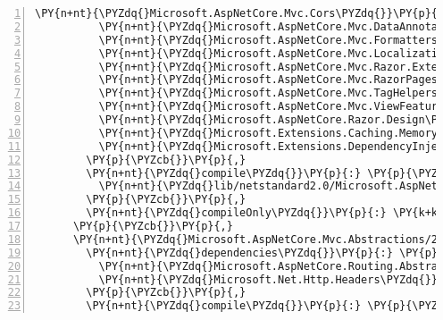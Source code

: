 \begin{Verbatim}[commandchars=\\\{\},numbers=left,firstnumber=1,stepnumber=1,numberblanklines=0]
          \PY{n+nt}{\PYZdq{}Microsoft.AspNetCore.Mvc.Cors\PYZdq{}}\PY{p}{:} \PY{l+s+s2}{\PYZdq{}2.1.0\PYZhy{}rc1\PYZhy{}final\PYZdq{}}\PY{p}{,}
          \PY{n+nt}{\PYZdq{}Microsoft.AspNetCore.Mvc.DataAnnotations\PYZdq{}}\PY{p}{:} \PY{l+s+s2}{\PYZdq{}2.1.0\PYZhy{}rc1\PYZhy{}final\PYZdq{}}\PY{p}{,}
          \PY{n+nt}{\PYZdq{}Microsoft.AspNetCore.Mvc.Formatters.Json\PYZdq{}}\PY{p}{:} \PY{l+s+s2}{\PYZdq{}2.1.0\PYZhy{}rc1\PYZhy{}final\PYZdq{}}\PY{p}{,}
          \PY{n+nt}{\PYZdq{}Microsoft.AspNetCore.Mvc.Localization\PYZdq{}}\PY{p}{:} \PY{l+s+s2}{\PYZdq{}2.1.0\PYZhy{}rc1\PYZhy{}final\PYZdq{}}\PY{p}{,}
          \PY{n+nt}{\PYZdq{}Microsoft.AspNetCore.Mvc.Razor.Extensions\PYZdq{}}\PY{p}{:} \PY{l+s+s2}{\PYZdq{}2.1.0\PYZhy{}rc1\PYZhy{}final\PYZdq{}}\PY{p}{,}
          \PY{n+nt}{\PYZdq{}Microsoft.AspNetCore.Mvc.RazorPages\PYZdq{}}\PY{p}{:} \PY{l+s+s2}{\PYZdq{}2.1.0\PYZhy{}rc1\PYZhy{}final\PYZdq{}}\PY{p}{,}
          \PY{n+nt}{\PYZdq{}Microsoft.AspNetCore.Mvc.TagHelpers\PYZdq{}}\PY{p}{:} \PY{l+s+s2}{\PYZdq{}2.1.0\PYZhy{}rc1\PYZhy{}final\PYZdq{}}\PY{p}{,}
          \PY{n+nt}{\PYZdq{}Microsoft.AspNetCore.Mvc.ViewFeatures\PYZdq{}}\PY{p}{:} \PY{l+s+s2}{\PYZdq{}2.1.0\PYZhy{}rc1\PYZhy{}final\PYZdq{}}\PY{p}{,}
          \PY{n+nt}{\PYZdq{}Microsoft.AspNetCore.Razor.Design\PYZdq{}}\PY{p}{:} \PY{l+s+s2}{\PYZdq{}2.1.0\PYZhy{}rc1\PYZhy{}final\PYZdq{}}\PY{p}{,}
          \PY{n+nt}{\PYZdq{}Microsoft.Extensions.Caching.Memory\PYZdq{}}\PY{p}{:} \PY{l+s+s2}{\PYZdq{}2.1.0\PYZhy{}rc1\PYZhy{}final\PYZdq{}}\PY{p}{,}
          \PY{n+nt}{\PYZdq{}Microsoft.Extensions.DependencyInjection\PYZdq{}}\PY{p}{:} \PY{l+s+s2}{\PYZdq{}2.1.0\PYZhy{}rc1\PYZhy{}final\PYZdq{}}
        \PY{p}{\PYZcb{}}\PY{p}{,}
        \PY{n+nt}{\PYZdq{}compile\PYZdq{}}\PY{p}{:} \PY{p}{\PYZob{}}
          \PY{n+nt}{\PYZdq{}lib/netstandard2.0/Microsoft.AspNetCore.Mvc.dll\PYZdq{}}\PY{p}{:} \PY{p}{\PYZob{}}\PY{p}{\PYZcb{}}
        \PY{p}{\PYZcb{}}\PY{p}{,}
        \PY{n+nt}{\PYZdq{}compileOnly\PYZdq{}}\PY{p}{:} \PY{k+kc}{true}
      \PY{p}{\PYZcb{}}\PY{p}{,}
      \PY{n+nt}{\PYZdq{}Microsoft.AspNetCore.Mvc.Abstractions/2.1.0\PYZhy{}rc1\PYZhy{}final\PYZdq{}}\PY{p}{:} \PY{p}{\PYZob{}}
        \PY{n+nt}{\PYZdq{}dependencies\PYZdq{}}\PY{p}{:} \PY{p}{\PYZob{}}
          \PY{n+nt}{\PYZdq{}Microsoft.AspNetCore.Routing.Abstractions\PYZdq{}}\PY{p}{:} \PY{l+s+s2}{\PYZdq{}2.1.0\PYZhy{}rc1\PYZhy{}final\PYZdq{}}\PY{p}{,}
          \PY{n+nt}{\PYZdq{}Microsoft.Net.Http.Headers\PYZdq{}}\PY{p}{:} \PY{l+s+s2}{\PYZdq{}2.1.0\PYZhy{}rc1\PYZhy{}final\PYZdq{}}
        \PY{p}{\PYZcb{}}\PY{p}{,}
        \PY{n+nt}{\PYZdq{}compile\PYZdq{}}\PY{p}{:} \PY{p}{\PYZob{}}

\end{Verbatim}
